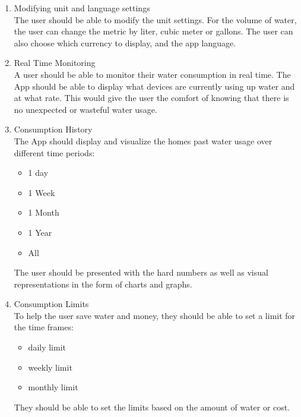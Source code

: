 \documentclass[10pt]{article}
\begin{document}
\begin{multicols*}{2}
\begin{enumerate}
  \item {Modifying unit and language settings} \\
  The user should be able to modify the unit settings. For the volume of water, the user can change the metric by liter, cubic meter or gallons. The user can also choose which currency to display, and the app language.
  \item {Real Time Monitoring} \\
  A user should be able to monitor their water consumption in real time. The App should be able to display what devices are currently using up water and at what rate. This would give the user the comfort of knowing that there is no unexpected or wasteful water usage.
  \item {Consumption History} \\
  The App should display and visualize the homes past water usage over different time periods:

  \begin{itemize}
    \item 1 day
  
    \item 1 Week
  
    \item 1 Month
  
    \item 1 Year
  
    \item All
  
  \end{itemize}

  The user should be presented with the hard numbers as well as visual representations in the form of charts and graphs.

  \item {Consumption Limits}\\
  To help the user save water and money, they should be able to set a limit for the time frames:

  \begin{itemize}
    \item daily limit
  
    \item weekly limit
  
    \item monthly limit
  
  \end{itemize}
  
  They should be able to set the limits based on the amount of water or cost.
  

\end{enumerate}
\end{multicols*}
\end{document}
